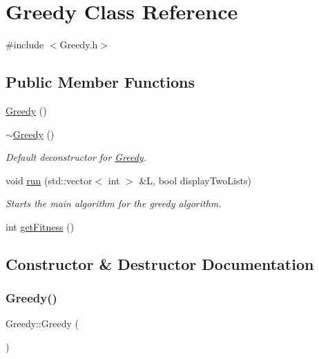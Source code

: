 \hypertarget{class_greedy}{}\section{Greedy Class Reference}
\label{class_greedy}


{\ttfamily \#include $<$Greedy.\+h$>$}

\subsection*{Public Member Functions}
\begin{DoxyCompactItemize}
\item 
\hyperlink{class_greedy_a916c0ab051f780c4d3ccec06f44bbf6c}{Greedy} ()
\item 
\hyperlink{class_greedy_a0d51cf66b934aec2d1a834ea1c1feb1f}{$\sim$\+Greedy} ()
\begin{DoxyCompactList}\small\item\em Default deconstructor for \hyperlink{class_greedy}{Greedy}. \end{DoxyCompactList}\item 
void \hyperlink{class_greedy_ac51edbfaebb1e123c887b923be647892}{run} (std\+::vector$<$ int $>$ \&L, bool display\+Two\+Lists)
\begin{DoxyCompactList}\small\item\em Starts the main algorithm for the greedy algorithm. \end{DoxyCompactList}\item 
int \hyperlink{class_greedy_a02a3d97f6cc544571aa33376ce9c6ebb}{get\+Fitness} ()
\end{DoxyCompactItemize}


\subsection{Constructor \& Destructor Documentation}
\hypertarget{class_greedy_a916c0ab051f780c4d3ccec06f44bbf6c}{}\label{class_greedy_a916c0ab051f780c4d3ccec06f44bbf6c} 
\subsubsection{\texorpdfstring{Greedy()}{Greedy()}}
{\footnotesize\ttfamily Greedy\+::\+Greedy (\begin{DoxyParamCaption}{ }\end{DoxyParamCaption})}

